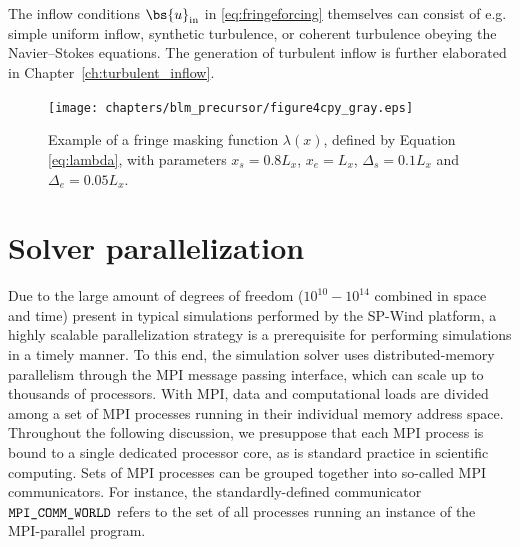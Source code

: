 The inflow conditions $\bs{u}_{\text{in}}$ in \eqref{eq:fringeforcing} themselves can consist of e.g. simple uniform inflow, synthetic turbulence, or coherent turbulence obeying the Navier--Stokes equations. The generation of turbulent inflow is further elaborated in Chapter~\ref{ch:turbulent_inflow}. 

\begin{figure}[t]
	\centering
	\texttt{[image: chapters/blm\_precursor/figure4cpy\_gray.eps]}
	\caption{Example of a fringe masking function $\lambda(x)$, defined by Equation \eqref{eq:lambda}, with parameters $x_{s} = 0.8L_x$, $x_{e} = L_x$, $\Delta_{s} = 0.1L_x$ and $\Delta_{e} = 0.05L_x$.}
	\label{fig:lambda}
\end{figure}	



\section{Solver parallelization}\label{sec:meth_par}
Due to the large amount of degrees of freedom ($10^{10} - 10^{14}$ combined in space and time) present in typical simulations performed by the SP-Wind platform, a highly scalable parallelization strategy is a prerequisite for performing simulations in a timely manner. To this end, the simulation solver uses distributed-memory parallelism through the MPI message passing interface, which can scale up to thousands of processors. With MPI, data and computational loads are divided among a set of MPI processes running in their individual memory address space. Throughout the following discussion, we presuppose that each MPI process is bound to a single dedicated processor core, as is standard practice in scientific computing. Sets of MPI processes can be grouped together into so-called MPI communicators. For instance, the standardly-defined communicator $\verb|MPI_COMM_WORLD|$ refers to the set of all processes running an instance of the MPI-parallel program.

